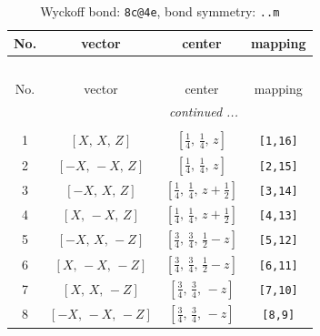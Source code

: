 \documentclass[fleqn,8pt]{jsarticle}
\begin{document}
\renewcommand{\arraystretch}{1.2}
\begin{longtable}{cccc}
\caption{Wyckoff bond: {\tt 8c@4e}, bond symmetry: {\tt ..m}}
 \\
 \hline \hline
No. & vector & center & mapping \\ \hline \endfirsthead

\multicolumn{3}{l}{\tablename\ \thetable{}} \\
 \hline \hline
No. & vector & center & mapping \\ \hline \endhead

 \hline \hline
\multicolumn{3}{r}{\footnotesize\it continued ...} \\ \endfoot

 \hline \hline
\multicolumn{3}{r}{} \\ \endlastfoot

1 & $\left[ X,\, X,\, Z \right]$ & $\left[ \frac{1}{4},\, \frac{1}{4},\, z \right]$ & {\tt [1,16]} \\ \hline
2 & $\left[ - X,\, - X,\, Z \right]$ & $\left[ \frac{1}{4},\, \frac{1}{4},\, z \right]$ & {\tt [2,15]} \\ \hline
3 & $\left[ - X,\, X,\, Z \right]$ & $\left[ \frac{1}{4},\, \frac{1}{4},\, z + \frac{1}{2} \right]$ & {\tt [3,14]} \\ \hline
4 & $\left[ X,\, - X,\, Z \right]$ & $\left[ \frac{1}{4},\, \frac{1}{4},\, z + \frac{1}{2} \right]$ & {\tt [4,13]} \\ \hline
5 & $\left[ - X,\, X,\, - Z \right]$ & $\left[ \frac{3}{4},\, \frac{3}{4},\, \frac{1}{2} - z \right]$ & {\tt [5,12]} \\ \hline
6 & $\left[ X,\, - X,\, - Z \right]$ & $\left[ \frac{3}{4},\, \frac{3}{4},\, \frac{1}{2} - z \right]$ & {\tt [6,11]} \\ \hline
7 & $\left[ X,\, X,\, - Z \right]$ & $\left[ \frac{3}{4},\, \frac{3}{4},\, - z \right]$ & {\tt [7,10]} \\ \hline
8 & $\left[ - X,\, - X,\, - Z \right]$ & $\left[ \frac{3}{4},\, \frac{3}{4},\, - z \right]$ & {\tt [8,9]} \\
\end{longtable}
\renewcommand{\arraystretch}{1.2}
\end{document}
